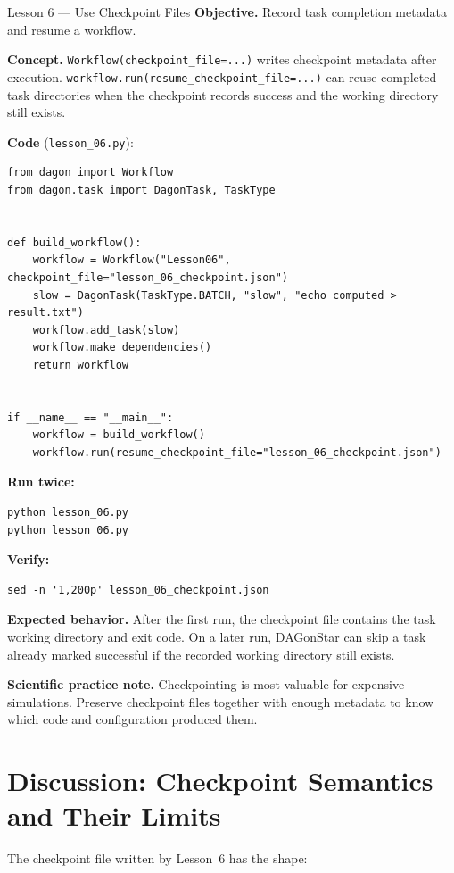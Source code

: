 \begin{lessonbox}{Lesson 6 --- Use Checkpoint Files}
\textbf{Objective.} Record task completion metadata and resume a workflow.

\textbf{Concept.} \texttt{Workflow(checkpoint\_file=...)} writes checkpoint
metadata after execution. \texttt{workflow.run(resume\_checkpoint\_file=...)}
can reuse completed task directories when the checkpoint records success and
the working directory still exists.

\textbf{Code} (\texttt{lesson\_06.py}):
\begin{lstlisting}
from dagon import Workflow
from dagon.task import DagonTask, TaskType


def build_workflow():
    workflow = Workflow("Lesson06", checkpoint_file="lesson_06_checkpoint.json")
    slow = DagonTask(TaskType.BATCH, "slow", "echo computed > result.txt")
    workflow.add_task(slow)
    workflow.make_dependencies()
    return workflow


if __name__ == "__main__":
    workflow = build_workflow()
    workflow.run(resume_checkpoint_file="lesson_06_checkpoint.json")
\end{lstlisting}

\textbf{Run twice:}
\begin{lstlisting}[style=bash]
python lesson_06.py
python lesson_06.py
\end{lstlisting}

\textbf{Verify:}
\begin{lstlisting}[style=bash]
sed -n '1,200p' lesson_06_checkpoint.json
\end{lstlisting}

\textbf{Expected behavior.} After the first run, the checkpoint file contains
the task working directory and exit code. On a later run, DAGonStar can skip
a task already marked successful if the recorded working directory still
exists.

\textbf{Scientific practice note.} Checkpointing is most valuable for
expensive simulations. Preserve checkpoint files together with enough
metadata to know which code and configuration produced them.
\end{lessonbox}

\section{Discussion: Checkpoint Semantics and Their Limits}

The checkpoint file written by Lesson~6 has the shape:

